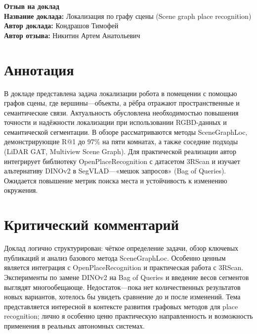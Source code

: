 \documentclass[11pt]{article}
\begin{document}
\begin{center}
    {\Large \textbf{Отзыв на доклад}}\\[1em]
    {\large \textbf{Название доклада:} Локализация по графу сцены (Scene graph place recognition)}\\[0.5em]
    {\large \textbf{Автор доклада:} Кондрашов Тимофей}\\[0.5em]
    {\large \textbf{Автор отзыва:} Никитин Артем Анатольевич}\\[2em]
\end{center}

\section*{Аннотация}
В докладе представлена задача локализации робота в помещении с помощью графов сцены, где вершины—объекты, а
рёбра отражают пространственные и семантические связи. Актуальность обусловлена необходимостью повышения точности и
надёжности локализации при использовании RGBD-данных и семантической сегментации. В обзоре рассматриваются методы
SceneGraphLoc, демонстрирующие R@1 до 97\% на пяти комнатах, а также соседние подходы (LiDAR GAT, Multiview Scene Graph).
Для практической реализации автор интегрирует библиотеку OpenPlaceRecognition с датасетом 3RScan и изучает альтернативу
DINOv2 в SegVLAD—«мешок запросов» (Bag of Queries). Ожидается повышение метрик поиска места и устойчивость к
изменению окружения.

\section*{Критический комментарий}
Доклад логично структурирован: чёткое определение задачи, обзор ключевых публикаций и анализ базового метода SceneGraphLoc.
Особенно ценным является интеграция с OpenPlaceRecognition и практическая работа с 3RScan. Эксперименты по замене DINOv2
на Bag of Queries и введение весов сегментов выглядят многообещающе. Недостаток—пока нет количественных результатов новых
вариантов, хотелось бы увидеть сравнение до и после изменений. Тема представляется интересной в контексте развития
графовых методов для place recognition; лично я особенно ценю практическую направленность и возможность применения в
реальных автономных системах.
\end{document}
